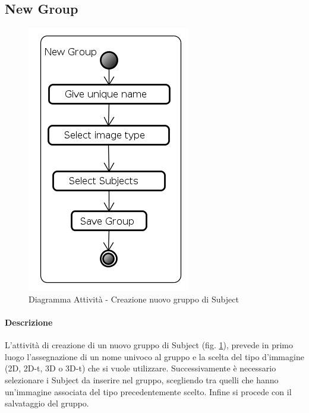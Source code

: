 \subsection{New Group}
\label{newGr}
\begin{figure}[!h]
\centering
\includegraphics[width=0.4\linewidth]{./Content/Immagini/New_Group}
\caption{Diagramma Attività - Creazione nuovo gruppo di Subject}
\label{newGroup}
\end{figure}
\paragraph{Descrizione\\}
L'attività di creazione di un nuovo gruppo di Subject\glossario{} (fig. \ref{newGroup}), prevede in primo luogo l'assegnazione di un nome univoco al gruppo e la scelta del tipo d'immagine (2D, 2D-t, 3D o 3D-t) che si vuole utilizzare. Successivamente è necessario selezionare i Subject\glossario{} da inserire nel gruppo, scegliendo tra quelli che hanno un'immagine associata del tipo precedentemente scelto. Infine si procede con il salvataggio del gruppo.
\pagebreak


